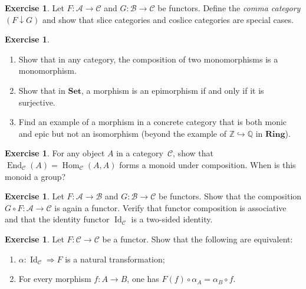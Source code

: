 \documentclass[a4paper,12pt]{book}
\DeclareMathOperator{\Hom}{Hom}
\DeclareMathOperator{\End}{End}
\DeclareMathOperator{\Id}{Id}
\newcommand{\Set}{\mathbf{Set}}
\newcommand{\Ring}{\mathbf{Ring}}
\newcommand{\Z}{\mathbb{Z}}
\newcommand{\Q}{\mathbb{Q}}
\theoremstyle{definition}
\newtheorem{exercise}[definition]{Exercise}
\theoremstyle{plain}
\theoremstyle{remark}
\begin{document}
\begin{exercise}\label{exo:comma-category}
Let $F\colon\mathcal{A}\to\mathcal{C}$ and
$G\colon\mathcal{B}\to\mathcal{C}$ be functors.
Define the \emph{comma category} $(F\downarrow G)$ and show that
slice categories and coslice categories are special cases.
\end{exercise}

\begin{exercise}\label{exo:mono-epi-exercises}
\begin{enumerate}[label=(\roman*)]
    \item Show that in any category, the composition of two
          monomorphisms is a monomorphism.
    \item Show that in $\Set$, a morphism is an epimorphism if and
          only if it is surjective.
    \item Find an example of a morphism in a concrete category that is
          both monic and epic but not an isomorphism
          (beyond the example of $\Z\hookrightarrow\Q$ in $\Ring$).
\end{enumerate}
\end{exercise}

\begin{exercise}\label{exo:endomorphism-monoid}
For any object $A$ in a category~$\mathcal{C}$, show that
$\End_\mathcal{C}(A)=\Hom_\mathcal{C}(A,A)$ forms a monoid under
composition.  When is this monoid a group?
\end{exercise}

\begin{exercise}\label{exo:functor-composition}
Let $F\colon\mathcal{A}\to\mathcal{B}$ and
$G\colon\mathcal{B}\to\mathcal{C}$ be functors.
Show that the composition $G\circ F\colon\mathcal{A}\to\mathcal{C}$
is again a functor.  Verify that functor composition is associative
and that the identity functor $\Id_\mathcal{C}$ is a two-sided identity.
\end{exercise}

\begin{exercise}\label{exo:nat-trans-id-functor}
Let $F\colon\mathcal{C}\to\mathcal{C}$ be a functor.
Show that the following are equivalent:
\begin{enumerate}[label=(\roman*)]
    \item $\alpha\colon\Id_\mathcal{C}\Rightarrow F$ is a natural
          transformation;
    \item For every morphism $f\colon A\to B$, one has
          $F(f)\circ\alpha_A = \alpha_B\circ f$.
\end{enumerate}
\end{exercise}
\end{document}
